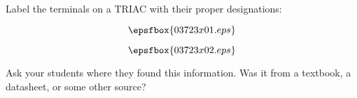 

Label the terminals on a TRIAC with their proper designations:

$$\epsfbox{03723x01.eps}$$







$$\epsfbox{03723x02.eps}$$







Ask your students where they found this information.  Was it from a textbook, a datasheet, or some other source?




